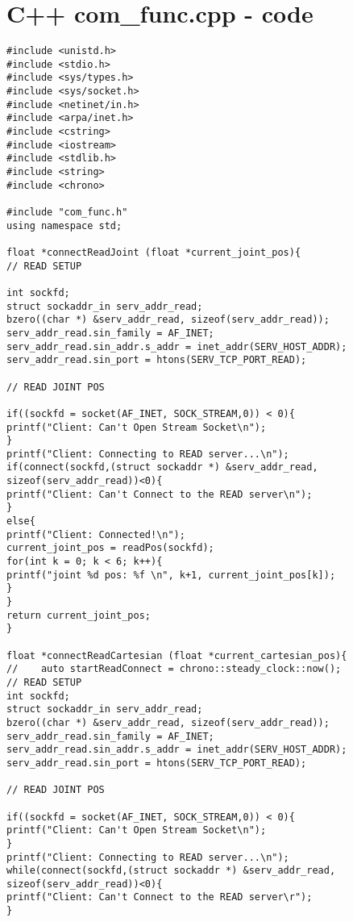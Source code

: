 \chapter{C++ com\_func.cpp - code}
\label{app:com_func.cpp}


\begin{lstlisting}[frame = single, label={lst:cppread1}]
#include <unistd.h>
#include <stdio.h>
#include <sys/types.h>
#include <sys/socket.h>
#include <netinet/in.h>
#include <arpa/inet.h>
#include <cstring>
#include <iostream>
#include <stdlib.h>
#include <string>
#include <chrono>

#include "com_func.h"
using namespace std;

float *connectReadJoint (float *current_joint_pos){
// READ SETUP

int sockfd;
struct sockaddr_in serv_addr_read;
bzero((char *) &serv_addr_read, sizeof(serv_addr_read));
serv_addr_read.sin_family = AF_INET;
serv_addr_read.sin_addr.s_addr = inet_addr(SERV_HOST_ADDR);
serv_addr_read.sin_port = htons(SERV_TCP_PORT_READ);

// READ JOINT POS

if((sockfd = socket(AF_INET, SOCK_STREAM,0)) < 0){
printf("Client: Can't Open Stream Socket\n");
}
printf("Client: Connecting to READ server...\n");
if(connect(sockfd,(struct sockaddr *) &serv_addr_read, sizeof(serv_addr_read))<0){
printf("Client: Can't Connect to the READ server\n");
}
else{
printf("Client: Connected!\n");
current_joint_pos = readPos(sockfd);
for(int k = 0; k < 6; k++){
printf("joint %d pos: %f \n", k+1, current_joint_pos[k]);
}
}
return current_joint_pos;
}

float *connectReadCartesian (float *current_cartesian_pos){
//    auto startReadConnect = chrono::steady_clock::now();
// READ SETUP
int sockfd;
struct sockaddr_in serv_addr_read;
bzero((char *) &serv_addr_read, sizeof(serv_addr_read));
serv_addr_read.sin_family = AF_INET;
serv_addr_read.sin_addr.s_addr = inet_addr(SERV_HOST_ADDR);
serv_addr_read.sin_port = htons(SERV_TCP_PORT_READ);

// READ JOINT POS

if((sockfd = socket(AF_INET, SOCK_STREAM,0)) < 0){
printf("Client: Can't Open Stream Socket\n");
}
printf("Client: Connecting to READ server...\n");
while(connect(sockfd,(struct sockaddr *) &serv_addr_read, sizeof(serv_addr_read))<0){
printf("Client: Can't Connect to the READ server\r");
}


\end{lstlisting}
